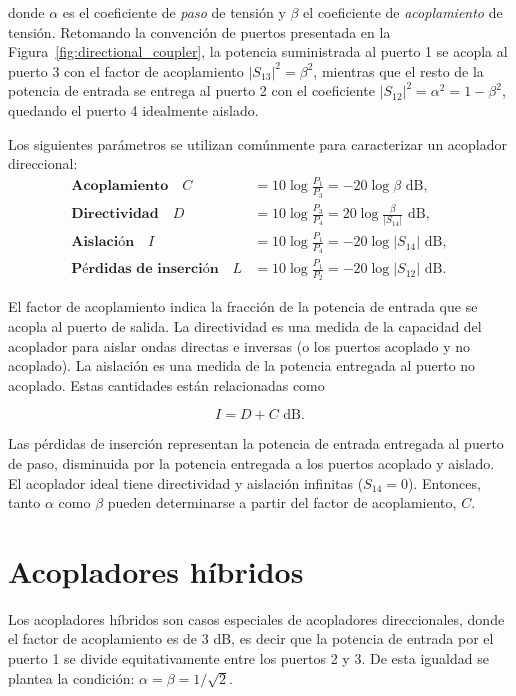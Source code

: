 \vspace{-0.5cm}

donde $\alpha$ es el coeficiente de \textit{paso} de tensión y $\beta$ el coeficiente de \textit{acoplamiento} de tensión. Retomando la convención de puertos presentada en la Figura~\ref{fig:directional_coupler}, la potencia suministrada al puerto 1 se acopla al puerto 3 con el factor de acoplamiento $|S_{13}|^2 = \beta^2$, mientras que el resto de la potencia de entrada se entrega al puerto 2 con el coeficiente $|S_{12}|^2 = \alpha^2 = 1 - \beta^2$, quedando el puerto 4 idealmente aislado.

Los siguientes parámetros se utilizan comúnmente para caracterizar un acoplador direccional:
\begingroup
    \allowdisplaybreaks
    \begin{align}
        \textbf{Acoplamiento} \quad C &= 10 \log \frac{P_1}{P_3} = -20 \log \beta \text{ dB}, \label{eq:coupling} \\
        \textbf{Directividad} \quad D &= 10 \log \frac{P_3}{P_4} = 20 \log \frac{\beta}{|S_{14}|} \text{ dB}, \label{eq:directivity} \\
        \textbf{Aislación} \quad I &= 10 \log \frac{P_1}{P_4} = -20 \log |S_{14}| \text{ dB}, \label{eq:isolation} \\
        \textbf{Pérdidas de inserción} \quad L &= 10 \log \frac{P_1}{P_2} = -20 \log |S_{12}| \text{ dB}. \label{eq:insertion_loss}
    \end{align}
\endgroup

El factor de acoplamiento indica la fracción de la potencia de entrada que se acopla al puerto de salida. La directividad es una medida de la capacidad del acoplador para aislar ondas directas e inversas (o los puertos acoplado y no acoplado). La aislación es una medida de la potencia entregada al puerto no acoplado. Estas cantidades están relacionadas como

\begin{equation}
    I = D + C \text{ dB}. \label{eq:relation}
\end{equation}

Las pérdidas de inserción representan la potencia de entrada entregada al puerto de paso, disminuida por la potencia entregada a los puertos acoplado y aislado. El acoplador ideal tiene directividad y aislación infinitas ($S_{14} = 0$). Entonces, tanto $\alpha$ como $\beta$ pueden determinarse a partir del factor de acoplamiento, $C$.

\section{Acopladores híbridos}
Los acopladores híbridos son casos especiales de acopladores direccionales, donde el factor de acoplamiento es de 3 dB, es decir que la potencia de entrada por el puerto 1 se divide equitativamente entre los puertos 2 y 3. De esta igualdad se plantea la condición: $\alpha = \beta = 1/\sqrt{2}$. 

